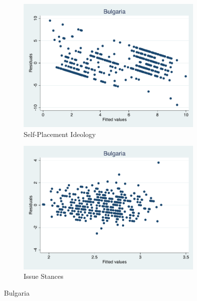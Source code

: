 \documentclass[12pt, titlepage]{article}
\begin{document}
\begin{figure}[H]
	\centering
	\begin{subfigure}[b]{0.475\textwidth}   
		\centering 
		\includegraphics[width=\textwidth]{Residuals/CountryIdeo/Bulgaria}
		\caption{Self-Placement Ideology}
	\end{subfigure}
	\hfill
	\begin{subfigure}[b]{0.475\textwidth}
		\centering 
		\includegraphics[width=\textwidth]{Residuals/CountryLib/Bulgaria}
		\caption{Issue Stances}
	\end{subfigure}
	\caption{Bulgaria}
	\label{Bulgaria}
\end{figure}
\end{document}
